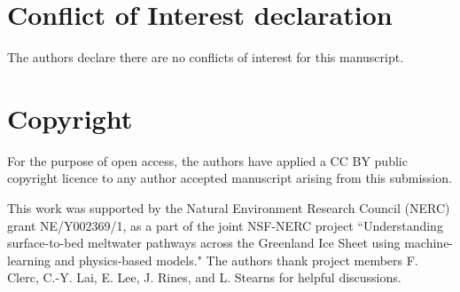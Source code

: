 \documentclass[draft]{agujournal2019}
\begin{document}
\section*{Conflict of Interest declaration}
The authors declare there are no conflicts of interest for this manuscript.

\section*{Copyright}
For the purpose of open access, the authors have applied a CC BY public copyright licence to any author accepted manuscript arising from this submission.

\acknowledgments
This work was supported by the Natural Environment Research Council (NERC) grant NE/Y002369/1, as a part of the joint NSF-NERC project ``Understanding surface-to-bed meltwater pathways across the Greenland Ice Sheet using machine-learning and physics-based models." The authors thank project members F. Clerc, C.-Y. Lai, E. Lee, J. Rines, and L. Stearns for helpful discussions.


\end{document}
